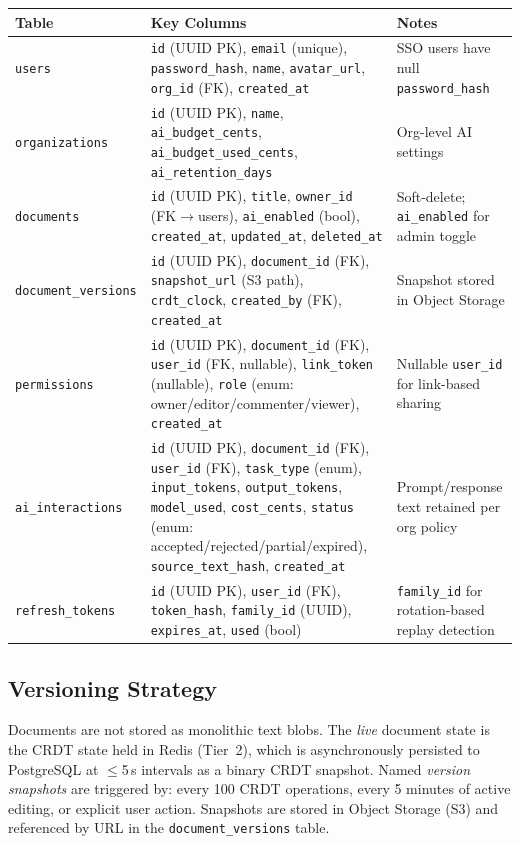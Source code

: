 \documentclass[10pt, a4paper]{article}
\begin{document}
{\scriptsize
\begin{tabularx}{\textwidth}{@{}lXl@{}}
\toprule
\textsf{\textbf{Table}} & \textsf{\textbf{Key Columns}} & \textsf{\textbf{Notes}} \\
\midrule
\texttt{users} & \texttt{id} (UUID PK), \texttt{email} (unique), \texttt{password\_hash}, \texttt{name}, \texttt{avatar\_url}, \texttt{org\_id} (FK), \texttt{created\_at} & SSO users have null \texttt{password\_hash} \\
\texttt{organizations} & \texttt{id} (UUID PK), \texttt{name}, \texttt{ai\_budget\_cents}, \texttt{ai\_budget\_used\_cents}, \texttt{ai\_retention\_days} & Org-level AI settings \\
\texttt{documents} & \texttt{id} (UUID PK), \texttt{title}, \texttt{owner\_id} (FK$\to$users), \texttt{ai\_enabled} (bool), \texttt{created\_at}, \texttt{updated\_at}, \texttt{deleted\_at} & Soft-delete; \texttt{ai\_enabled} for admin toggle \\
\texttt{document\_versions} & \texttt{id} (UUID PK), \texttt{document\_id} (FK), \texttt{snapshot\_url} (S3 path), \texttt{crdt\_clock}, \texttt{created\_by} (FK), \texttt{created\_at} & Snapshot stored in Object Storage \\
\texttt{permissions} & \texttt{id} (UUID PK), \texttt{document\_id} (FK), \texttt{user\_id} (FK, nullable), \texttt{link\_token} (nullable), \texttt{role} (enum: owner/editor/commenter/viewer), \texttt{created\_at} & Nullable \texttt{user\_id} for link-based sharing \\
\texttt{ai\_interactions} & \texttt{id} (UUID PK), \texttt{document\_id} (FK), \texttt{user\_id} (FK), \texttt{task\_type} (enum), \texttt{input\_tokens}, \texttt{output\_tokens}, \texttt{model\_used}, \texttt{cost\_cents}, \texttt{status} (enum: accepted/rejected/partial/expired), \texttt{source\_text\_hash}, \texttt{created\_at} & Prompt/response text retained per org policy \\
\texttt{refresh\_tokens} & \texttt{id} (UUID PK), \texttt{user\_id} (FK), \texttt{token\_hash}, \texttt{family\_id} (UUID), \texttt{expires\_at}, \texttt{used} (bool) & \texttt{family\_id} for rotation-based replay detection \\
\bottomrule
\end{tabularx}
}

\subsection{Versioning Strategy}
Documents are not stored as monolithic text blobs. The \emph{live} document state is the CRDT state held in Redis (Tier~2), which is asynchronously persisted to PostgreSQL at $\le$5\,s intervals as a binary CRDT snapshot. Named \emph{version snapshots} are triggered by: every 100 CRDT operations, every 5 minutes of active editing, or explicit user action. Snapshots are stored in Object Storage (S3) and referenced by URL in the \texttt{document\_versions} table.
\end{document}
